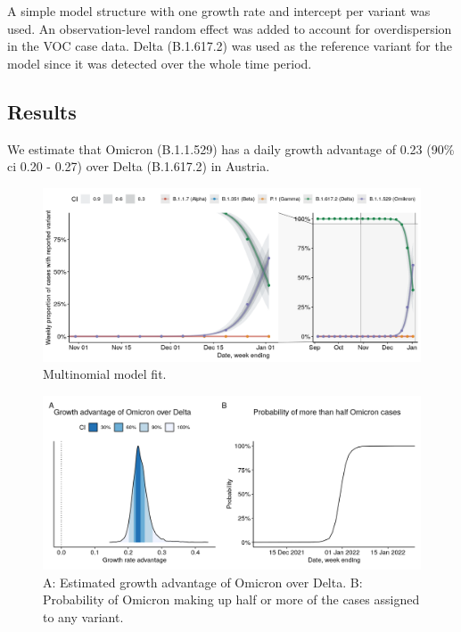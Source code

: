 \documentclass[
]{article}
\begin{document}
A simple model structure with one growth rate and intercept per variant was used. An observation-level random effect was added to account for overdispersion\autocite{harrisonUsingObservationlevelRandom2014} in the VOC case data. Delta (B.1.617.2) was used as the reference variant for the model since it was detected over the whole time period.

\hypertarget{results-1}{%
\subsection{Results}\label{results-1}}

We estimate that Omicron (B.1.1.529) has a daily growth advantage of 0.23
(90\% ci 0.20 - 0.27) over Delta (B.1.617.2) in Austria.

\begin{figure}

{\centering \includegraphics[width=0.8\linewidth]{omicron_austria_files/figure-latex/multinomial-fit-zoomed-1} 

}

\caption{Multinomial model fit.}\label{fig:multinomial-fit-zoomed}
\end{figure}

\begin{figure}

{\centering \includegraphics[width=0.8\linewidth]{omicron_austria_files/figure-latex/multinomial-growth-posterior-1} 

}

\caption{A: Estimated growth advantage of Omicron over Delta. B: Probability of Omicron making up half or more of the cases assigned to any variant.}\label{fig:multinomial-growth-posterior}
\end{figure}
\end{document}
